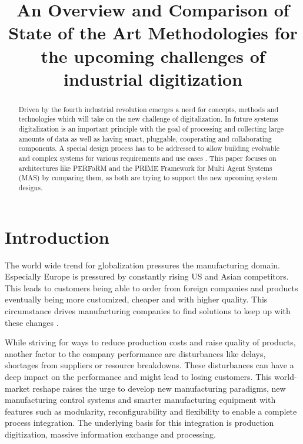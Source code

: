 \documentclass[conference,compsoc,hidelinks]{IEEEtran}
\begin{document}
\title{An Overview and Comparison of State of the Art Methodologies for the upcoming challenges of industrial digitization}

\author{
}

\maketitle

\begin{abstract}
Driven by the fourth industrial revolution emerges a need for concepts, methods and technologies which will take on the new challenge of digitalization. In future systems digitalization is an important principle with the goal of processing and collecting large amounts of data as well as having smart, pluggable, cooperating and collaborating components. A special design process has to be addressed to allow building evolvable and complex systems for various requirements and use cases \cite{Peres2017}. This paper focuses on architectures like PERFoRM and the PRIME Framework for Multi Agent Systems (MAS) by comparing them, as both are trying to support the new upcoming system designs.
\end{abstract}

\section{Introduction} %
The world wide trend for globalization pressures the manufacturing domain. Especially Europe is pressured by constantly rising US and Asian competitors. This leads to customers being able to order from foreign companies and products eventually being more customized, cheaper and with higher quality. This circumstance drives manufacturing companies to find solutions to keep up with these changes \cite{HarmonizedSystems}. 

While striving for ways to reduce production costs and raise quality of products, another factor to the company performance are disturbances like delays, shortages from suppliers or resource breakdowns. These disturbances can have a deep impact on the performance and might lead to losing customers. This world-market reshape raises the urge to develop new manufacturing paradigms, new manufacturing control systems and smarter manufacturing equipment with features such as modularity, reconfigurability and flexibility \cite{SCHEIFELE2014398} to enable a complete process integration. The underlying basis for this integration is production digitization, massive information exchange and processing. 
\end{document}
